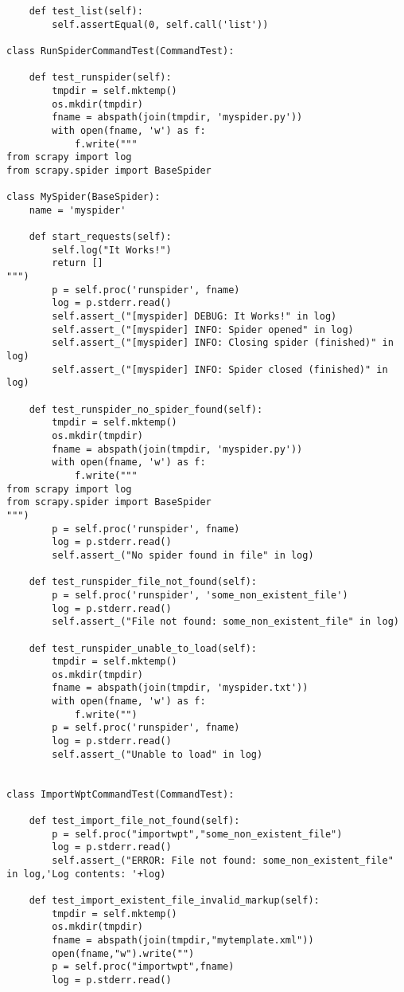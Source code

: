 \begin{lstlisting}
    def test_list(self):
        self.assertEqual(0, self.call('list'))

class RunSpiderCommandTest(CommandTest):

    def test_runspider(self):
        tmpdir = self.mktemp()
        os.mkdir(tmpdir)
        fname = abspath(join(tmpdir, 'myspider.py'))
        with open(fname, 'w') as f:
            f.write("""
from scrapy import log
from scrapy.spider import BaseSpider

class MySpider(BaseSpider):
    name = 'myspider'

    def start_requests(self):
        self.log("It Works!")
        return []
""")
        p = self.proc('runspider', fname)
        log = p.stderr.read()
        self.assert_("[myspider] DEBUG: It Works!" in log)
        self.assert_("[myspider] INFO: Spider opened" in log)
        self.assert_("[myspider] INFO: Closing spider (finished)" in log)
        self.assert_("[myspider] INFO: Spider closed (finished)" in log)

    def test_runspider_no_spider_found(self):
        tmpdir = self.mktemp()
        os.mkdir(tmpdir)
        fname = abspath(join(tmpdir, 'myspider.py'))
        with open(fname, 'w') as f:
            f.write("""
from scrapy import log
from scrapy.spider import BaseSpider
""")
        p = self.proc('runspider', fname)
        log = p.stderr.read()
        self.assert_("No spider found in file" in log)

    def test_runspider_file_not_found(self):
        p = self.proc('runspider', 'some_non_existent_file')
        log = p.stderr.read()
        self.assert_("File not found: some_non_existent_file" in log)

    def test_runspider_unable_to_load(self):
        tmpdir = self.mktemp()
        os.mkdir(tmpdir)
        fname = abspath(join(tmpdir, 'myspider.txt'))
        with open(fname, 'w') as f:
            f.write("")
        p = self.proc('runspider', fname)
        log = p.stderr.read()
        self.assert_("Unable to load" in log)


class ImportWptCommandTest(CommandTest):

    def test_import_file_not_found(self):
        p = self.proc("importwpt","some_non_existent_file")
        log = p.stderr.read()
        self.assert_("ERROR: File not found: some_non_existent_file" in log,'Log contents: '+log)

    def test_import_existent_file_invalid_markup(self):
        tmpdir = self.mktemp()
        os.mkdir(tmpdir)
        fname = abspath(join(tmpdir,"mytemplate.xml"))
        open(fname,"w").write("")
        p = self.proc("importwpt",fname)
        log = p.stderr.read()


\end{lstlisting}
